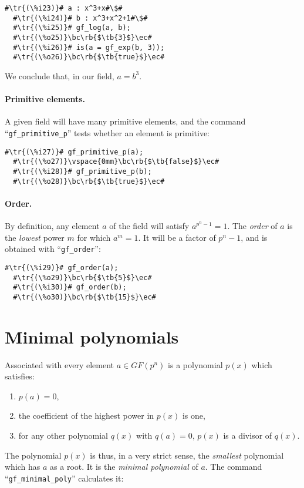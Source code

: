 \documentclass[a4paper,11pt,leqno,fleqn]{artikel3}
\newcommand{\bc}{\begin{center}}
\newcommand{\ec}{\end{center}}
\newcommand{\tr}[1]{\textcolor{red}{#1}}
\newcommand{\tb}[1]{\textcolor{blue}{#1}}
\newcommand{\rb}[1]{\raisebox{2mm}[0mm][1mm]{#1}}
\begin{document}
\vspace*{2mm}
\begin{lstlisting}[escapechar=\#]
  #\tr{(\%i23)}# a : x^3+x#\$#
  #\tr{(\%i24)}# b : x^3+x^2+1#\$#
  #\tr{(\%i25)}# gf_log(a, b);
  #\tr{(\%o25)}\bc\rb{$\tb{3}$}\ec#
  #\tr{(\%i26)}# is(a = gf_exp(b, 3));
  #\tr{(\%o26)}\bc\rb{$\tb{true}$}\ec#
\end{lstlisting}

We conclude that, in our field, $a=b^{3}$.


\paragraph{Primitive elements.}

A given field will have many primitive elements, and the command
``\verb!gf_primitive_p!'' tests whether an element is primitive:

\vspace*{2mm}
\begin{lstlisting}[escapechar=\#]
  #\tr{(\%i27)}# gf_primitive_p(a);
  #\tr{(\%o27)}\vspace{0mm}\bc\rb{$\tb{false}$}\ec#
  #\tr{(\%i28)}# gf_primitive_p(b);
  #\tr{(\%o28)}\bc\rb{$\tb{true}$}\ec#
\end{lstlisting}


\paragraph{Order.}

By definition, any element $a$ of the field will satisfy $a^{p^n-1}=1$.  The
\emph{order} of $a$ is the \emph{lowest} power $m$ for which $a^m=1$.  It will
be a factor of $p^n-1$, and is obtained with ``\verb!gf_order!'':

\vspace*{2mm}
\begin{lstlisting}[escapechar=\#]
  #\tr{(\%i29)}# gf_order(a);
  #\tr{(\%o29)}\bc\rb{$\tb{5}$}\ec#
  #\tr{(\%i30)}# gf_order(b);
  #\tr{(\%o30)}\bc\rb{$\tb{15}$}\ec#
\end{lstlisting}


\section*{Minimal polynomials}

Associated with every element $a\in GF(p^n)$ is a polynomial $p(x)$ which
satisfies:
\begin{enumerate}
\item $p(a)=0$,
\item the coefficient of the highest power in $p(x)$ is one,
\item for any other polynomial $q(x)$ with $q(a)=0$, $p(x)$ is a divisor of $q(x)$.
\end{enumerate}
The polynomial $p(x)$ is thus, in a very strict sense, the \emph{smallest}
polynomial which has $a$ as a root.  It is the \emph{minimal polynomial} of
$a$.  The command ``\verb!gf_minimal_poly!'' calculates it:
\end{document}
